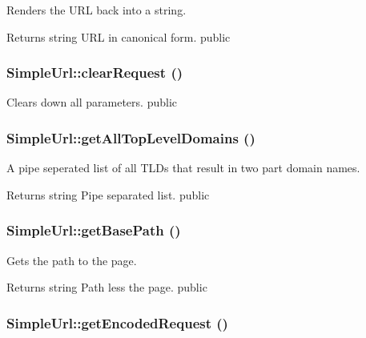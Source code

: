 \label{class_simple_url_aacb36466e60fa5c022e9c30fb82caf67}
Renders the URL back into a string. \begin{DoxyReturn}{Returns}
string URL in canonical form.  public 
\end{DoxyReturn}
\hypertarget{class_simple_url_ad8b21a3ad600952a57aada6e157a1d7b}{
\subsubsection[{clearRequest}]{\setlength{\rightskip}{0pt plus 5cm}SimpleUrl::clearRequest ()}}
\label{class_simple_url_ad8b21a3ad600952a57aada6e157a1d7b}
Clears down all parameters.  public \hypertarget{class_simple_url_a6b3d4e1240aedd44290fe7b21b36a4e9}{
\subsubsection[{getAllTopLevelDomains}]{\setlength{\rightskip}{0pt plus 5cm}SimpleUrl::getAllTopLevelDomains ()}}
\label{class_simple_url_a6b3d4e1240aedd44290fe7b21b36a4e9}
A pipe seperated list of all TLDs that result in two part domain names. \begin{DoxyReturn}{Returns}
string Pipe separated list.  public 
\end{DoxyReturn}
\hypertarget{class_simple_url_a365bd0b1cd84de5ed75b1b561b3f32cc}{
\subsubsection[{getBasePath}]{\setlength{\rightskip}{0pt plus 5cm}SimpleUrl::getBasePath ()}}
\label{class_simple_url_a365bd0b1cd84de5ed75b1b561b3f32cc}
Gets the path to the page. \begin{DoxyReturn}{Returns}
string Path less the page.  public 
\end{DoxyReturn}
\hypertarget{class_simple_url_a902d795b570581c345a9cb1018db2f82}{
\subsubsection[{getEncodedRequest}]{\setlength{\rightskip}{0pt plus 5cm}SimpleUrl::getEncodedRequest ()}}
